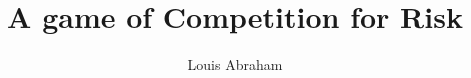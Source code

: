 \documentclass[preprint,12pt,authoryear]{elsarticle}
\theoremstyle{definition}
\begin{document}
\begin{frontmatter}



\title{A game of Competition for Risk}


\author[inst1,inst2]{Louis Abraham}

\address[inst1]{Université Paris 1 Panthéon--Sorbonne}

\address[inst2]{Association Française d'Épargne et de Retraite (AFER)}

            




\end{frontmatter}
\end{document}
